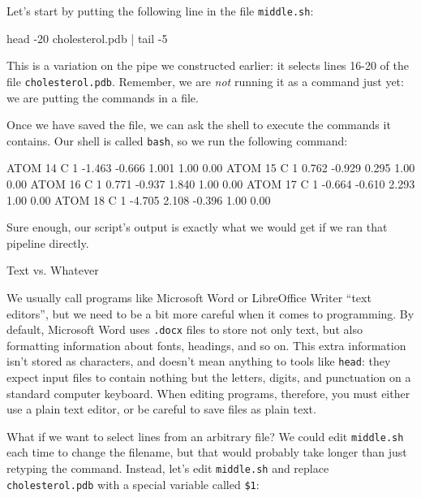\documentclass{book}
\begin{document}
Let's start by putting the following line in the file
\texttt{middle.sh}:

\begin{VerbFile}
head -20 cholesterol.pdb | tail -5
\end{VerbFile}

This is a variation on the pipe we constructed earlier: it selects lines
16-20 of the file \texttt{cholesterol.pdb}. Remember, we are \emph{not}
running it as a command just yet: we are putting the commands in a file.

Once we have saved the file, we can ask the shell to execute the
commands it contains. Our shell is called \texttt{bash}, so we run the
following command:


\begin{VerbOut}
ATOM     14  C           1      -1.463  -0.666   1.001  1.00  0.00
ATOM     15  C           1       0.762  -0.929   0.295  1.00  0.00
ATOM     16  C           1       0.771  -0.937   1.840  1.00  0.00
ATOM     17  C           1      -0.664  -0.610   2.293  1.00  0.00
ATOM     18  C           1      -4.705   2.108  -0.396  1.00  0.00
\end{VerbOut}

Sure enough, our script's output is exactly what we would get if we ran
that pipeline directly.

\begin{swcbox}{Text vs. Whatever}

We usually call programs like Microsoft Word or LibreOffice Writer
``text editors'', but we need to be a bit more careful when it comes to
programming. By default, Microsoft Word uses \texttt{.docx} files to
store not only text, but also formatting information about fonts,
headings, and so on. This extra information isn't stored as characters,
and doesn't mean anything to tools like \texttt{head}: they expect input
files to contain nothing but the letters, digits, and punctuation on a
standard computer keyboard. When editing programs, therefore, you must
either use a plain text editor, or be careful to save files as plain
text.

\end{swcbox}

What if we want to select lines from an arbitrary file? We could edit
\texttt{middle.sh} each time to change the filename, but that would
probably take longer than just retyping the command. Instead, let's edit
\texttt{middle.sh} and replace \texttt{cholesterol.pdb} with a special
variable called \texttt{\$1}:
\end{document}
